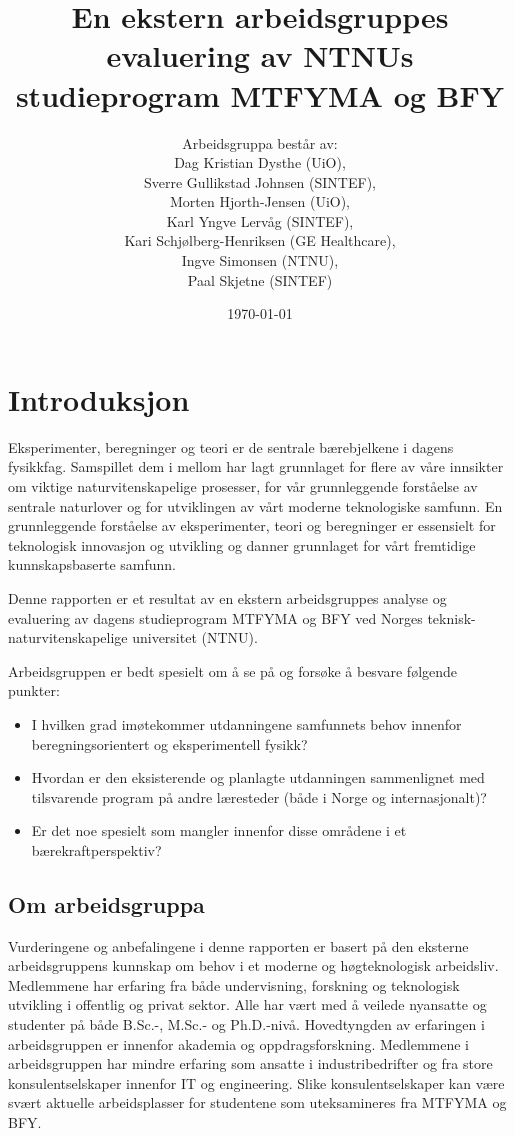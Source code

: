 \documentclass{article}
\title{En ekstern arbeidsgruppes evaluering av NTNUs studieprogram MTFYMA og BFY}
\author{Arbeidsgruppa består av: \\ Dag Kristian Dysthe (UiO), \\ Sverre Gullikstad Johnsen (SINTEF), \\ Morten Hjorth-Jensen (UiO), \\ Karl Yngve Lervåg (SINTEF), \\ Kari Schjølberg-Henriksen (GE Healthcare), \\ Ingve Simonsen (NTNU), \\ Paal Skjetne (SINTEF)}
\date{\today}
\begin{document}
\maketitle

\begin{abstract}

\end{abstract}

\newpage
\tableofcontents

\newpage
\section{Introduksjon}
Eksperimenter, beregninger og teori er de sentrale bærebjelkene i dagens fysikkfag. Samspillet dem i mellom  har lagt grunnlaget for flere av våre innsikter om viktige naturvitenskapelige prosesser, for vår grunnleggende forståelse av sentrale naturlover og for utviklingen av vårt moderne teknologiske samfunn. En grunnleggende forståelse av eksperimenter, teori og beregninger er essensielt for  teknologisk innovasjon og utvikling og danner grunnlaget for vårt fremtidige kunnskapsbaserte samfunn.

Denne rapporten er et resultat av en ekstern arbeidsgruppes analyse og evaluering av dagens studieprogram MTFYMA og BFY ved Norges teknisk-naturvitenskapelige universitet (NTNU).

Arbeidsgruppen er bedt spesielt om å se på og forsøke å besvare følgende punkter:
\begin{itemize}
  \item I hvilken grad imøtekommer utdanningene samfunnets behov innenfor beregningsorientert og eksperimentell fysikk?
  \item Hvordan er den eksisterende og planlagte utdanningen sammenlignet med tilsvarende program på andre læresteder (både i Norge og internasjonalt)?
  \item Er det noe spesielt som mangler innenfor disse områdene i et bærekraftperspektiv?
\end{itemize}

\subsection{Om arbeidsgruppa}
Vurderingene og anbefalingene i denne rapporten er basert på den eksterne arbeidsgruppens kunnskap om behov i et moderne og høgteknologisk arbeidsliv.  Medlemmene har erfaring fra både undervisning, forskning og teknologisk utvikling i offentlig og privat sektor. Alle har vært med å veilede nyansatte og studenter på både B.Sc.-, M.Sc.- og Ph.D.-nivå. Hovedtyngden av erfaringen i arbeidsgruppen er innenfor akademia og oppdragsforskning. Medlemmene i arbeidsgruppen har mindre erfaring som ansatte i industribedrifter og fra store konsulentselskaper innenfor IT og engineering. Slike konsulentselskaper kan være svært aktuelle arbeidsplasser for studentene som uteksamineres fra MTFYMA og BFY.
\end{document}
